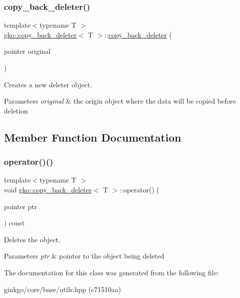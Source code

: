 \subsubsection{\texorpdfstring{copy\+\_\+back\+\_\+deleter()}{copy\_back\_deleter()}}
{\footnotesize\ttfamily template$<$typename T $>$ \\
\hyperlink{classgko_1_1copy__back__deleter}{gko\+::copy\+\_\+back\+\_\+deleter}$<$ T $>$\+::\hyperlink{classgko_1_1copy__back__deleter}{copy\+\_\+back\+\_\+deleter} (\begin{DoxyParamCaption}\item[{pointer}]{original }\end{DoxyParamCaption})\hspace{0.3cm}{\ttfamily [inline]}}



Creates a new deleter object. 


\begin{DoxyParams}{Parameters}
{\em original} & the origin object where the data will be copied before deletion \\
\hline
\end{DoxyParams}


\subsection{Member Function Documentation}
\mbox{\label{classgko_1_1copy__back__deleter_a34bba76c78c23dccd814969e98c78b1b}} 
\subsubsection{\texorpdfstring{operator()()}{operator()()}}
{\footnotesize\ttfamily template$<$typename T $>$ \\
void \hyperlink{classgko_1_1copy__back__deleter}{gko\+::copy\+\_\+back\+\_\+deleter}$<$ T $>$\+::operator() (\begin{DoxyParamCaption}\item[{pointer}]{ptr }\end{DoxyParamCaption}) const\hspace{0.3cm}{\ttfamily [inline]}}



Deletes the object. 


\begin{DoxyParams}{Parameters}
{\em ptr} & pointer to the object being deleted \\
\hline
\end{DoxyParams}


The documentation for this class was generated from the following file\+:\begin{DoxyCompactItemize}
\item 
ginkgo/core/base/utils.\+hpp (c71510aa)\end{DoxyCompactItemize}
